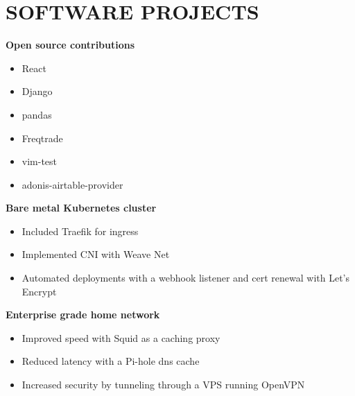 \documentclass[12pt]{resume}
\begin{document}
    \begin{minipage}[t]{0.369\textwidth}
        {\section* {SOFTWARE PROJECTS}}
        \vspace{.5em}

        {\bf Open source contributions}\\
        \begin{minipage}[t]{0.33\textwidth}
            \vspace{-.5em}
            \begin{itemize}
                \setlength\itemsep{-.2em}
                \item {React}
                \item {Django}
                \item {pandas}
            \end{itemize}
        \end{minipage}
        \begin{minipage}[t]{0.7\textwidth}
            \vspace{-.5em}
            \begin{itemize}
                \setlength\itemsep{-.2em}
                \item {Freqtrade}
                \item {vim-test}
                \item {adonis-airtable-provider}
            \end{itemize}
        \end{minipage}
        \vspace{.7em}

        {\bf Bare metal Kubernetes cluster}\\
        \vspace{-.5em}
        \begin{itemize}
            \setlength\itemsep{-.2em}
            \item {Included Traefik for ingress}
            \item {Implemented CNI with Weave Net}
            \item {Automated deployments with a webhook listener and cert renewal with Let's Encrypt}
        \end{itemize}


        {\bf Enterprise grade home network}\\
        \vspace{-1.25em}
        \begin{itemize}
            \setlength\itemsep{-.2em}
            \item {Improved speed with Squid as a caching proxy}
            \item {Reduced latency with a Pi-hole dns cache}
            \item {Increased security by tunneling through a VPS running OpenVPN}
        \end{itemize}


\end{minipage}
\end{document}
